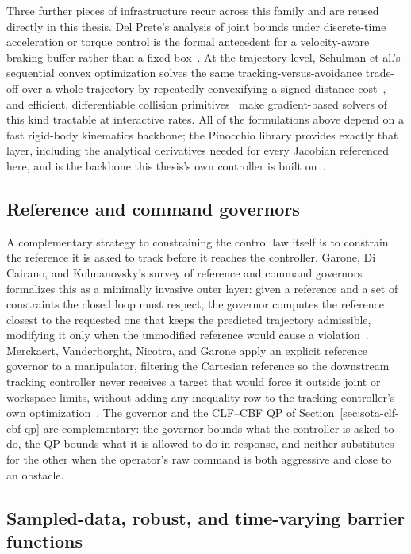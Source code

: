 Three further pieces of infrastructure recur across this family and are reused directly in this thesis. Del Prete's analysis of joint bounds under discrete-time acceleration or torque control is the formal antecedent for a velocity-aware braking buffer rather than a fixed box~\cite{delprete2018joint}. At the trajectory level, Schulman et al.'s sequential convex optimization solves the same tracking-versus-avoidance trade-off over a whole trajectory by repeatedly convexifying a signed-distance cost~\cite{schulman2014trajopt}, and efficient, differentiable collision primitives~\cite{tracy2022diffpills,montaut2023diffcol} make gradient-based solvers of this kind tractable at interactive rates. All of the formulations above depend on a fast rigid-body kinematics backbone; the Pinocchio library provides exactly that layer, including the analytical derivatives needed for every Jacobian referenced here, and is the backbone this thesis's own controller is built on~\cite{carpentier2019}.

\subsection{Reference and command governors}
\label{sec:sota-governors}

A complementary strategy to constraining the control law itself is to constrain the reference it is asked to track before it reaches the controller. Garone, Di Cairano, and Kolmanovsky's survey of reference and command governors formalizes this as a minimally invasive outer layer: given a reference and a set of constraints the closed loop must respect, the governor computes the reference closest to the requested one that keeps the predicted trajectory admissible, modifying it only when the unmodified reference would cause a violation~\cite{garone2017}. Merckaert, Vanderborght, Nicotra, and Garone apply an explicit reference governor to a manipulator, filtering the Cartesian reference so the downstream tracking controller never receives a target that would force it outside joint or workspace limits, without adding any inequality row to the tracking controller's own optimization~\cite{merckaert2018constrained}. The governor and the CLF--CBF QP of Section~\ref{sec:sota-clf-cbf-qp} are complementary: the governor bounds what the controller is asked to do, the QP bounds what it is allowed to do in response, and neither substitutes for the other when the operator's raw command is both aggressive and close to an obstacle.

\subsection{Sampled-data, robust, and time-varying barrier functions}
\label{sec:sota-sampled-cbf}

